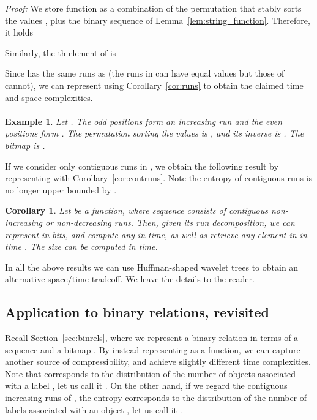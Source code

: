 \documentclass[11pt]{article}
\newtheorem{corollary}[theorem]{Corollary}
\newenvironment{proof}{\textit{Proof:}}{\hfill \paragraph{} }
\newtheorem{example}{Example}
\begin{document}
\begin{table}[t]
{\begin{tabular}
\begin{proof}
We store function  as a combination of the permutation  that
stably sorts the values , plus the binary sequence  of
Lemma~\ref{lem:string_function}.
Therefore, it holds
 
Similarly, the th element of  is 

Since  has the same runs as  (the runs in  can have equal
values but those of  cannot), we can represent  using
Corollary~\ref{cor:runs} to obtain the claimed time and space complexities.
\end{proof}

\begin{example}
Let . The odd positions form an increasing
run  and the even positions form . The permutation
 sorting the values is , and its inverse is
. The bitmap  is .
\end{example}

If we consider only contiguous runs in , we obtain the following result by 
representing  with Corollary~\ref{cor:contruns}.
Note the entropy of contiguous runs is no longer upper bounded by .

\begin{corollary} \label{cor:contiguous_function}
Let  be a function, where 
sequence  consists of  contiguous non-increasing or
non-decreasing runs. Then, given its run decomposition, we can represent  
in  bits, and 
compute any  in  time, as well as 
retrieve any element in  in time . 
The size  can be computed in  time.
\end{corollary}

In all the above results we can use Huffman-shaped wavelet trees 
\cite{BN11} to obtain an alternative space/time tradeoff. We leave the
details to the reader.

\subsection{Application to binary relations, revisited} 

Recall Section~\ref{sec:binrels}, where we represent a binary relation in
terms of a sequence  and a bitmap .
By instead representing  as a function, we can capture another source of
compressibility, and achieve slightly different time complexities.
Note that  corresponds to the distribution of the number 
of objects associated with a label , let us call it
 .
On the other hand, if we regard the contiguous increasing runs of , the 
entropy corresponds to the distribution of the number  of labels 
associated with an object , let us call it
.


\end{tabular}}
\end{table}
\end{document}
